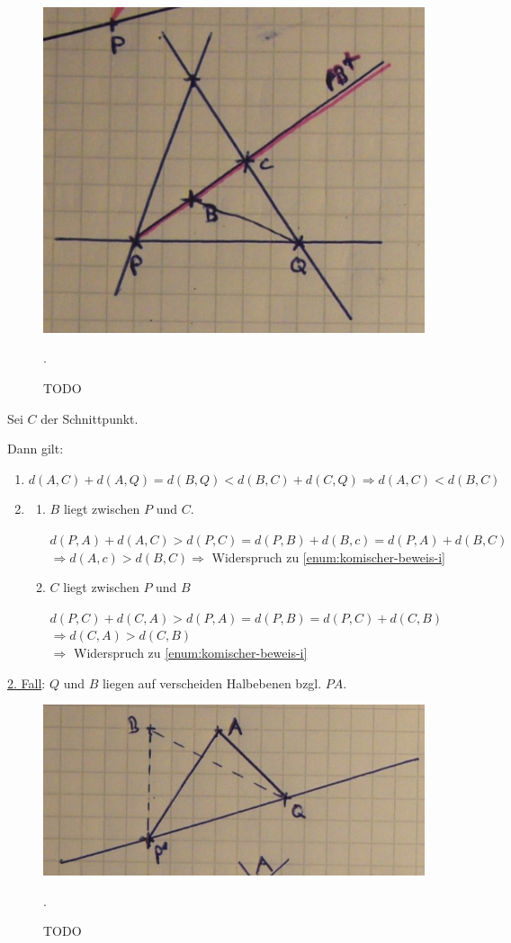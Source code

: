 \begin{beweis}
\begin{beweis}
\begin{beweis}
            \begin{figure}
                \centering
                \includegraphics[width=0.5\linewidth, keepaspectratio]{figures/todo/bild-3.jpg}
                \caption{TODO}.
                \label{fig:bild-3}
            \end{figure}

            Sei $C$ der Schnittpunkt.

            Dann gilt:
            \begin{enumerate}[label=(\roman*)]
                \item $d(A, C) + d(A, Q) = d(B, Q) < d(B, C) + d(C, Q) \Rightarrow d(A, C) < d(B, C)$ \label{enum:komischer-beweis-i}
                \item \begin{enumerate}[label=\alph*)]
                        \item $B$ liegt zwischen $P$ und $C$.

                              $d(P,A) + d(A, C) > d(P,C) = d(P,B) + d(B,c) = d(P,A) + d(B,C)$
                              $\Rightarrow d(A,c) > d(B,C) \Rightarrow$ Widerspruch zu \ref{enum:komischer-beweis-i}
                        \item $C$ liegt zwischen $P$ und $B$

                              $d(P,C) + d(C,A) > d(P,A) = d(P,B) = d(P,C) + d(C, B)$\\
                              $\Rightarrow d(C, A) > d(C, B)$\\
                              $\Rightarrow$ Widerspruch zu \ref{enum:komischer-beweis-i}
                    \end{enumerate}
            \end{enumerate}

            \underline{2. Fall}: $Q$ und $B$ liegen auf verscheiden Halbebenen bzgl. $PA$.

            \begin{figure}
                \centering
                \includegraphics[width=0.5\linewidth, keepaspectratio]{figures/todo/bild-4.jpg}
                \caption{TODO}.
                \label{fig:bild-4}
            \end{figure}


\end{beweis}
\end{beweis}
\end{beweis}
